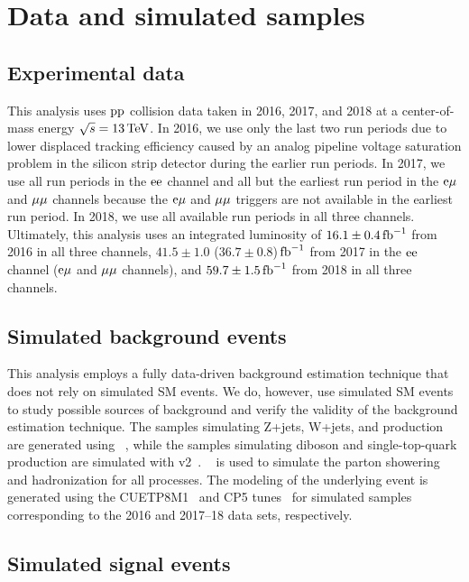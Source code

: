 \section{Data and simulated samples}
\label{samples}

\subsection{Experimental data}
This analysis uses $\mathrm{p}\mathrm{p}$ collision data taken in 2016, 2017, and 2018 at a center-of-mass energy $\sqrt{s} = 13\,\text{Te\hspace{-.08em}V}$. In 2016, we use only the last two run periods due to lower displaced tracking efficiency caused by an analog pipeline voltage saturation problem in the silicon strip detector during the earlier run periods. In 2017, we use all run periods in the $\mathrm{e}\mathrm{e}$ channel and all but the earliest run period in the $\mathrm{e}{\mu}$ and ${\mu}{\mu}$ channels because the $\mathrm{e}{\mu}$ and ${\mu}{\mu}$ triggers are not available in the earliest run period. In 2018, we use all available run periods in all three channels. Ultimately, this analysis uses an integrated luminosity of $16.1\pm0.4\mbox{\ensuremath{\,\text{fb}^\text{$-$1}}}$ from 2016 in all three channels, $41.5\pm1.0$ ($36.7\pm0.8$)$\mbox{\ensuremath{\,\text{fb}^\text{$-$1}}}$ from 2017 in the $\mathrm{e}\mathrm{e}$ channel ($\mathrm{e}{\mu}$ and ${\mu}{\mu}$ channels), and $59.7\pm1.5\mbox{\ensuremath{\,\text{fb}^\text{$-$1}}}$ from 2018 in all three channels.


\subsection{Simulated background events}
\label{bg_samples}
This analysis employs a fully data-driven background estimation technique that does not rely on simulated SM events. We do, however, use simulated SM events to study possible sources of background and verify the validity of the background estimation technique. The samples simulating Z+jets, W+jets, and \ttbar production are generated using \MGvATNLO~\cite{madgraph,fxfx,mlm}, while the samples simulating diboson and single-top-quark production are simulated with \POWHEG v2~\cite{Frixione:2002ik,Nason:2004rx,Frixione:2007vw,Alioli:2008gx,Alioli:2010xd}. ~\cite{PYTHIA8} is used to simulate the parton showering and hadronization for all processes. The modeling of the underlying event is generated using the CUETP8M1~\cite{Khachatryan:2015pea} and CP5 tunes~\cite{Sirunyan:2019dfx} for simulated samples corresponding to the 2016 and 2017--18 data sets, respectively.

\subsection{Simulated signal events}

